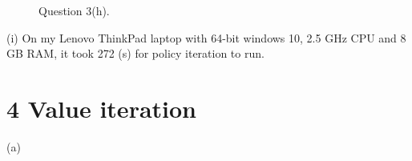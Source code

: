 \documentclass{article}
\begin{document}
\begin{figure}[h!]
\begin{minipage}{0.5\textwidth}
\end{minipage}
\qquad
\begin{minipage}{0.4\textwidth}%
\end{minipage}

\caption{Question 3(h).}
\label{fig:globfig}
\end{figure}	

	
	
	\newpage
	(i) 	On my Lenovo ThinkPad laptop with 64-bit windows 10, 2.5 GHz CPU and 8 GB RAM, it took 272 (s) for policy iteration to run. 
	
	
	\newpage
	\section*{4  Value iteration}
	(a) 	
\end{document}
